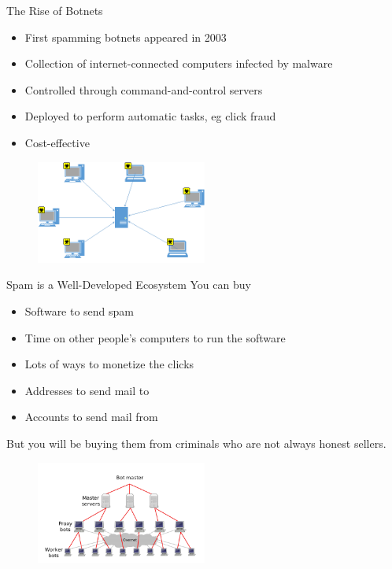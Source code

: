 \documentclass[nobackground,dvipsnames,table,aspectratio=169]{beamer}
\begin{document}
\begin{frame}{The Rise of Botnets}
    \begin{itemize}
        \item First spamming botnets appeared in 2003
        \item Collection of internet-connected computers infected by malware
        \item Controlled through command-and-control servers
        \item Deployed to perform automatic tasks, eg click fraud 
        \item Cost-effective
    \end{itemize}
    \begin{figure}
        \centering
        \includegraphics[width=0.5\textwidth]{botnet}
    \end{figure}
\end{frame}

\begin{frame}{Spam is a Well-Developed Ecosystem}
    You can buy
    \begin{itemize}
        \item Software to send spam
        \item Time on other people’s computers to run the software
        \item Lots of ways to monetize the clicks
        \item Addresses to send mail to
        \item Accounts to send mail from
    \end{itemize}
    But you will be buying them from criminals who are not always honest sellers.
    \begin{figure}
        \includegraphics[width=0.5\textwidth, right]{botnet-structure}
    \end{figure}
\end{frame}
\end{document}
